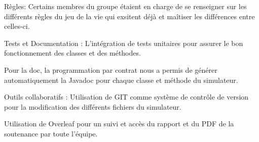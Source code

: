Règles:
Certains membres du groupe étaient en charge de se renseigner sur les différents règles du jeu de la vie qui exsitent déjà et maîtiser les différences entre celles-ci.

Tests et Documentation :
L'intégration de tests unitaires pour assurer le bon fonctionnement des classes et des méthodes.

Pour la doc, la programmation par contrat nous a permis de générer automatiquement la Javadoc pour chaque classe et méthode du simulateur.

Outils collaboratifs :
Utilisation de GIT comme système de contrôle de version pour la modification des différents fichiers du simulateur.

Utilisation de Overleaf pour un suivi et accès du rapport et du PDF de la soutenance par toute l'équipe.
